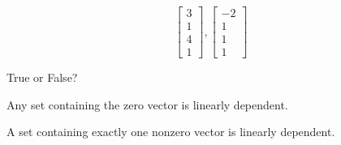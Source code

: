 \documentclass{ximera}
\begin{document}
\begin{problem}
\begin{problem}
\begin{multipleChoice}
 \end{multipleChoice}
\end{problem}

\begin{problem}\label{prob:linindmultchoice4}
$$\begin{bmatrix}3\\1\\4\\1\end{bmatrix}, \begin{bmatrix}-2\\1\\1\\1\end{bmatrix}$$

\begin{multipleChoice}
 \end{multipleChoice}
\end{problem}

\end{problem}

\begin{problem} True or False?
\begin{problem}\label{prob:TFlinind1}
Any set containing the zero vector is linearly dependent.
\begin{multipleChoice}
 \end{multipleChoice}
 \end{problem}
\begin{problem}\label{prob:TFlinind2}
A set containing exactly one nonzero vector is linearly dependent.
\begin{multipleChoice}
 \end{multipleChoice}
\end{problem}

\end{problem}
\end{document}
